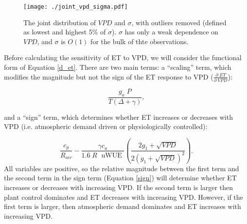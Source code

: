 \documentclass[draft,linenumbers]{gcbjournal}
\begin{document}
\begin{figure}
\centering
\texttt{[image: ./joint\_vpd\_sigma.pdf]}
\caption{The joint distribution of $VPD$ and $\sigma$, with outliers removed (defined as lowest and highest 5\% of $\sigma$). $\sigma$ has only a weak dependence on $VPD$, and $\sigma$ is $O(1)$ for the bulk of thte observations.}
\label{joint_vpd_sigma}
\end{figure}

Before calculating the sensitivity of ET to VPD, we will consider the functional form of Equation \ref{d_et}. There are two main terms: a ``scaling'' term, which modifies the magnitude but not the sign of the ET response to VPD  ($\frac{\partial \; ET}{\partial \; VPD}$):

\begin{equation}
  \frac{g_a \; P}{T(\Delta + \gamma)},
\end{equation}

and a ``sign'' term, which determines whether ET increases or decreases with VPD (i.e. atmospheric demand driven or physiologically controlled):

\begin{equation}
  \label{sign}
  \frac{c_p}{R_{air}} - \frac{\gamma c_a }{1.6 \; R\; \text{ uWUE }} \left( \frac{2 g_1 + \sqrt{VPD}}{2 (g_1 + \sqrt{VPD})^2}\right).
\end{equation}
All variables are positive, so the relative magnitude between the first term and the second term in the sign term (Equation \ref{sign}) will determine whether ET increases or decreases with increasing VPD. If the second term is larger then plant control dominates and ET decreases with increasing VPD. However, if the first term is larger, then atmospheric demand dominates and ET increases with increasing VPD. 
\end{document}
